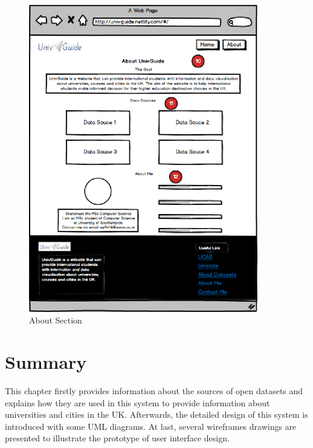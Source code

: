 \begin{figure}[H]
  \centering
  \includegraphics[width=10cm]{./img/Picture15}
  \caption{About Section}
  \label{Figure:figex}
\end{figure}



\section{Summary}

This chapter firstly provides information about the sources of open datasets and explains how they are used in this system to provide information about universities and cities in the UK. Afterwards, the detailed design of this system is introduced with some UML diagrams. At last, several wireframes drawings are presented to illustrate the prototype of user interface design. 





